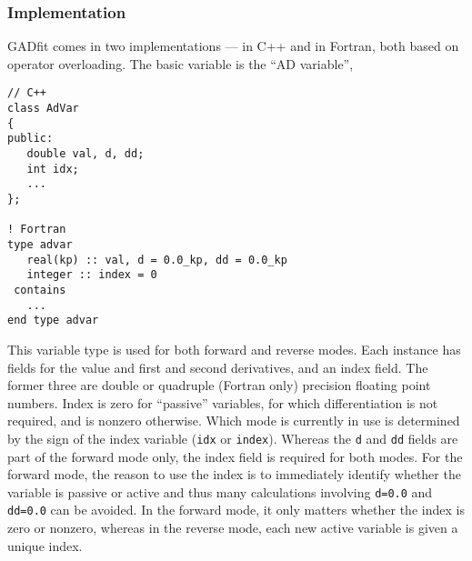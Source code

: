 \documentclass{article}
\begin{document}
\subsubsection{Implementation}

GADfit comes in two implementations --- in C++ and in Fortran, both based on operator overloading. The basic variable is the ``AD variable'',
\begin{verbatim}
// C++
class AdVar
{
public:
   double val, d, dd;
   int idx;
   ...
};

! Fortran
type advar
   real(kp) :: val, d = 0.0_kp, dd = 0.0_kp
   integer :: index = 0
 contains
   ...
end type advar
\end{verbatim}
This variable type is used for both forward and reverse modes. Each instance has fields for the value and first and second derivatives, and an index field. The former three are double or quadruple (Fortran only) precision floating point numbers. Index is zero for ``passive'' variables, for which differentiation is not required, and is nonzero otherwise. Which mode is currently in use is determined by the sign of the index variable (\texttt{idx}  or \texttt{index}). Whereas the \texttt{d} and \texttt{dd} fields are part of the forward mode only, the index field is required for both modes. For the forward mode, the reason to use the index is to immediately identify whether the variable is passive or active and thus many calculations involving \texttt{d=0.0} and \texttt{dd=0.0} can be avoided. In the forward mode, it only matters whether the index is zero or nonzero, whereas in the reverse mode, each new active variable is given a unique index.
\end{document}
